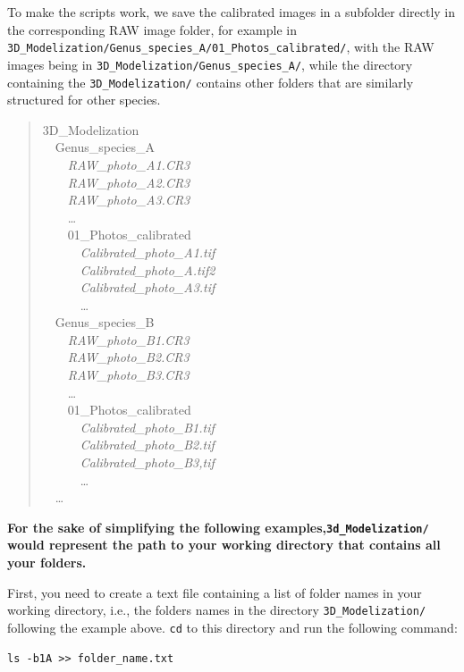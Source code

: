 \documentclass[
]{book}
\begin{document}
To make the scripts work, we save the calibrated images in a subfolder directly in
the corresponding RAW image folder, for example in \texttt{3D\_Modelization/Genus\_species\_A/01\_Photos\_calibrated/},
with the RAW images being in \texttt{3D\_Modelization/Genus\_species\_A/}, while the directory containing the
\texttt{3D\_Modelization/} contains other folders that are similarly structured for other species.

\begin{quote}
3D\_Modelization\\
 Genus\_species\_A\\
  \emph{RAW\_photo\_A1.CR3}\\
  \emph{RAW\_photo\_A2.CR3}\\
  \emph{RAW\_photo\_A3.CR3}\\
  \ldots{}\\
  01\_Photos\_calibrated\\
   \emph{Calibrated\_photo\_A1.tif}\\
   \emph{Calibrated\_photo\_A.tif2}\\
   \emph{Calibrated\_photo\_A3.tif}\\
   \ldots{}\\
 Genus\_species\_B\\
  \emph{RAW\_photo\_B1.CR3}\\
  \emph{RAW\_photo\_B2.CR3}\\
  \emph{RAW\_photo\_B3.CR3}\\
  \ldots{}\\
  01\_Photos\_calibrated\\
   \emph{Calibrated\_photo\_B1.tif}\\
   \emph{Calibrated\_photo\_B2.tif}\\
   \emph{Calibrated\_photo\_B3,tif}\\
   \ldots{}\\
 \ldots{}\\
\end{quote}

\textbf{For the sake of simplifying the following examples,\texttt{3d\_Modelization/} would represent the path to your working directory that contains all your folders.}

First, you need to create a text file containing a list of folder names in your
working directory, i.e., the folders names in the directory \texttt{3D\_Modelization/}
following the example above. \texttt{cd} to this directory and run the following command:

\begin{verbatim}
ls -b1A >> folder_name.txt
\end{verbatim}
\end{document}
